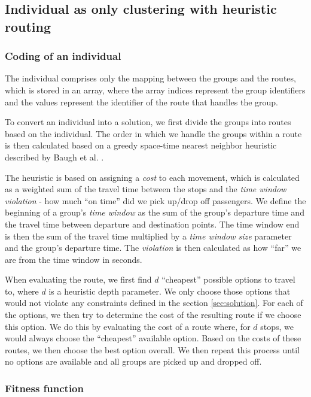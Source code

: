 \subsection{Individual as only clustering with heuristic routing}

\subsubsection{Coding of an individual}

The individual comprises only the mapping between the groups and the routes, which is stored in an array, where the array indices represent the group identifiers and the values represent the identifier of the route that handles the group.

To convert an individual into a solution, we first divide the groups into routes based on the individual. The order in which we handle the groups within a route is then calculated based on a greedy space-time nearest neighbor heuristic described by Baugh et al. \cite{doi:10.1080/03052159808941240}.

The heuristic is based on assigning a \textit{cost} to each movement, which is calculated as a weighted sum of the travel time between the stops and the \textit{time window violation} - how much ``on time'' did we pick up/drop off passengers. We define the beginning of a group's \textit{time window} as the sum of the group's departure time and the travel time between departure and destination points. The time window end is then the sum of the travel time multiplied by a \textit{time window size} parameter and the group's departure time. The \textit{violation} is then calculated as how ``far'' we are from the time window in seconds.

When evaluating the route, we first find $d$ ``cheapest'' possible options to travel to, where $d$ is a heuristic depth parameter. We only choose those options that would not violate any constraints defined in the section \ref{sec:solution}. For each of the options, we then try to determine the cost of the resulting route if we choose this option. We do this by evaluating the cost of a route where, for $d$ stops, we would always choose the ``cheapest'' available option. Based on the costs of these routes, we then choose the best option overall. We then repeat this process until no options are available and all groups are picked up and dropped off.

\subsubsection{Fitness function}


